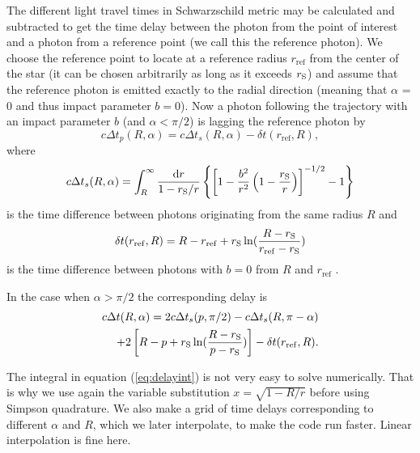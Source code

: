 \documentclass{wihuri}
\def\rg{r_{\rm S}} %
\def\be{\begin{equation}}
\def\ee{\end{equation}}
\def\d{{\rm d}}
\def\rg{r_{\rm S}} %
\begin{document}
The different light travel times in Schwarzschild metric may be calculated and subtracted to get the time delay between the photon from the point of interest and a photon from a reference point (we call this the reference photon). We choose the reference point to locate at a reference radius $r_{\mathrm{ref}}$ from the center of the star (it can be chosen arbitrarily as long as it exceeds $\rg$) and assume that the reference photon is emitted exactly to the radial direction (meaning that $\alpha$ = 0 and thus impact parameter $b = 0$). Now a photon following the trajectory with an impact parameter $b$ (and $\alpha < \pi/2$) is lagging the reference photon by 
\cite{pechenick}
\be \label{eq:delay2}
c\Delta t_{p}(R,\alpha)=  c\Delta t_{s}(R,\alpha) -\delta t(r_{\mathrm{ref}},R),
\ee
where 
\be \label{eq:delayint}
c\Delta t_{s}(R,\alpha) =
\int_R^{\infty} \frac{\d r}{1- \rg/r}
\left\{ \left[ 1-  \frac{b^2}{r^2}  \left( 1- \frac{\rg}{r} \right)
\right] ^{-1/2}  -1 \right\}
\ee
is the time difference between photons originating from the same radius $R$ and
\be
\delta t(r_{\mathrm{ref}},R) = R-r_{\mathrm{ref}}+\rg\ln(\frac{R-\rg}{r_{\mathrm{ref}}-\rg})
\ee
is the time difference between photons with $b=0$ from $R$ and $r_{\mathrm{ref}}$ \cite{falkner}. 

In the case when $\alpha > \pi/2$ the corresponding delay is
\be\label{eq:delay22}
\begin{split}
c\Delta t(R,\alpha)= 2c\Delta t_{s}(p,\pi/2)-c\Delta t_{s}(R,\pi-\alpha)\\+2\left[ R-p+\rg\ln(\frac{R-\rg}{p-\rg})\right]-\delta t(r_{\mathrm{ref}},R).
\end{split}
\ee

The integral in equation (\ref{eq:delayint}) is not very easy to solve numerically. That is why we use again the variable substitution $x = \sqrt{1-R/r}$ before using Simpson quadrature. We also make a grid of time delays corresponding to different $\alpha$ and $R$, which we later interpolate, to make the code run faster. Linear interpolation is fine here.
\end{document}
